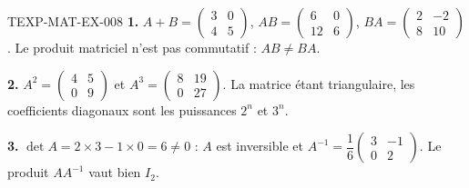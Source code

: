 \begin{corrige}{TEXP-MAT-EX-008}
\textbf{1.} $A+B=\begin{pmatrix}3&0\\4&5\end{pmatrix}$,
$AB=\begin{pmatrix}6&0\\12&6\end{pmatrix}$,
$BA=\begin{pmatrix}2&-2\\8&10\end{pmatrix}$. Le produit matriciel n'est pas
commutatif : $AB\neq BA$.

\textbf{2.} $A^2=\begin{pmatrix}4&5\\0&9\end{pmatrix}$ et
$A^3=\begin{pmatrix}8&19\\0&27\end{pmatrix}$. La matrice étant triangulaire,
les coefficients diagonaux sont les puissances $2^n$ et $3^n$.

\textbf{3.} $\det A=2\times3-1\times0=6\neq0$ : $A$ est inversible et
$A^{-1}=\dfrac{1}{6}\begin{pmatrix}3&-1\\0&2\end{pmatrix}$. Le produit
$AA^{-1}$ vaut bien $I_2$.
\end{corrige}
